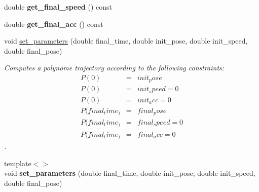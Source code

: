 \begin{DoxyCompactItemize}
\item 
\mbox{\label{classblmc__robots_1_1TimePolynome_acfb927d4c52380114308ec694eede80a}} 
double {\bfseries get\+\_\+final\+\_\+speed} () const
\item 
\mbox{\label{classblmc__robots_1_1TimePolynome_aafdcb054558d12a22c1084ad844226c9}} 
double {\bfseries get\+\_\+final\+\_\+acc} () const
\item 
void \hyperlink{classblmc__robots_1_1TimePolynome_ac7576e3ab26e11a183268dcc4721e6e5}{set\+\_\+parameters} (double final\+\_\+time, double init\+\_\+pose, double init\+\_\+speed, double final\+\_\+pose)
\begin{DoxyCompactList}\small\item\em Computes a polynome trajectory according to the following constraints\+: \begin{eqnarray*} P(0) &=& init_pose \\ P(0) &=& init_speed = 0 \\ P(0) &=& init_acc = 0 \\ P(final_time_) &=& final_pose \\ P(final_time_) &=& final_speed = 0 \\ P(final_time_) &=& final_acc = 0 \end{eqnarray*}. \end{DoxyCompactList}\item 
\mbox{\label{classblmc__robots_1_1TimePolynome_a46a01352c9e81a8135530facbf7cbcc6}} 
{\footnotesize template$<$$>$ }\\void {\bfseries set\+\_\+parameters} (double final\+\_\+time, double init\+\_\+pose, double init\+\_\+speed, double final\+\_\+pose)
\end{DoxyCompactItemize}
